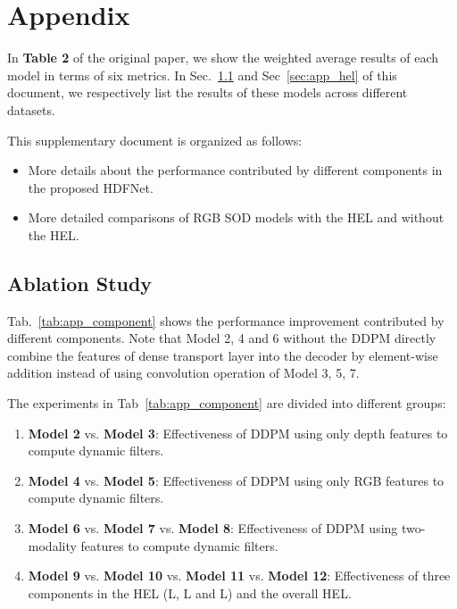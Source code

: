 \documentclass[runningheads]{llncs}
\begin{document}
\appendix

\section{Appendix}\label{sec:appendix}

\noindent In \textbf{Table 2} of the original paper, we show the weighted average results of each model in terms of six metrics. In Sec.~\ref{sec:app_component} and Sec~\ref{sec:app_hel} of this document, we respectively list the results of these models across different datasets.

This supplementary document is organized as follows:
\begin{itemize}[noitemsep, nolistsep]
 \item More details about the performance contributed by different components in the proposed HDFNet.
 \item More detailed comparisons of RGB SOD models with the HEL and without the HEL.
\end{itemize}

\subsection{Ablation Study}\label{sec:app_component}

Tab.~\ref{tab:app_component} shows the performance improvement contributed by different components. Note that Model 2, 4 and 6 without the DDPM directly combine the features of dense transport layer into the decoder by element-wise addition instead of using convolution operation of Model 3, 5, 7.

The experiments in Tab~\ref{tab:app_component} are divided into different groups:
\begin{enumerate}
 \item \textbf{Model 2} vs. \textbf{Model 3}: Effectiveness of DDPM using only depth features to compute dynamic filters.
 \item \textbf{Model 4} vs. \textbf{Model 5}: Effectiveness of DDPM using only RGB features to compute dynamic filters.
 \item \textbf{Model 6} vs. \textbf{Model 7} vs. \textbf{Model 8}: Effectiveness of DDPM using two-modality features to compute dynamic filters.
 \item \textbf{Model 9} vs. \textbf{Model 10} vs. \textbf{Model 11} vs. \textbf{Model 12}: Effectiveness of three components in the HEL (L, L and L) and the overall HEL.
\end{enumerate}
\end{document}

